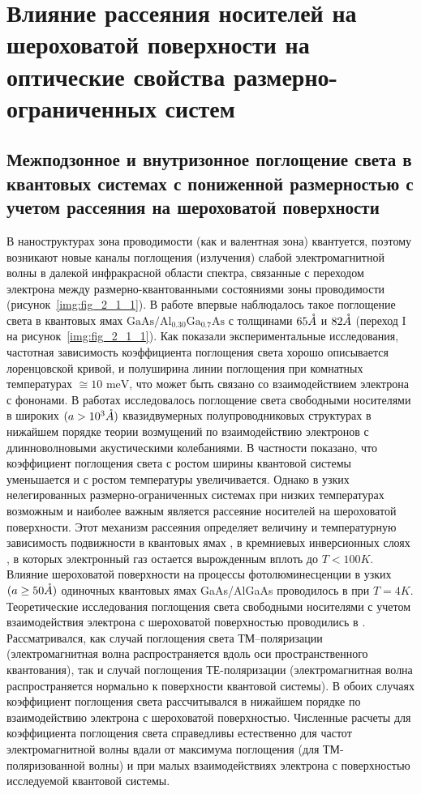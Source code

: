\chapter{Влияние рассеяния носителей на шероховатой поверхности на оптические свойства размерно-ограниченных систем} \label{chapt2}

\section{Межподзонное и внутризонное поглощение света в квантовых системах с пониженной размерностью с учетом рассеяния на шероховатой поверхности} \label{sect2_1}

В наноструктурах зона проводимости (как и валентная зона) квантуется, поэтому возникают новые каналы поглощения (излучения) слабой электромагнитной волны в далекой инфракрасной области спектра, связанные с переходом электрона между размерно-квантованными состояниями зоны проводимости (рисунок~\ref{img:fig_2_1_1}).  В работе \cite{West1985} впервые наблюдалось такое поглощение света в квантовых ямах $\text{GaAs}/\text{Al}_{0.30}\text{Ga}_{0.7}\text{As}$ с толщинами $65 \AA$ и $82 \AA$ (переход I на рисунок~\ref{img:fig_2_1_1}). Как показали экспериментальные исследования, частотная зависимость коэффициента поглощения света хорошо описывается лоренцовской кривой, и полуширина линии поглощения при комнатных температурах $\cong 10 \text{ meV}$, что может быть связано со взаимодействием электрона с фононами. В работах \cite{Wu1994,Spector1983} исследовалось поглощение света свободными носителями в широких $(a > 10^3 \AA)$ квазидвумерных полупроводниковых структурах в нижайшем порядке теории возмущений по взаимодействию электронов с длинноволновыми акустическими колебаниями. В частности показано, что коэффициент поглощения света с ростом ширины квантовой системы уменьшается и с ростом температуры увеличивается. Однако в узких нелегированных размерно-ограниченных системах при низких температурах возможным и наиболее важным является рассеяние носителей на шероховатой поверхности. Этот механизм рассеяния определяет величину и температурную зависимость подвижности в квантовых ямах \cite{Sakaki1987}, в кремниевых инверсионных слоях \cite{Stern1980}, в которых электронный газ остается вырожденным вплоть до $T < 100 K$. Влияние шероховатой поверхности на процессы фотолюминесценции в узких $(a \geq 50 \AA)$ одиночных квантовых ямах GaAs/AlGaAs  проводилось в \cite{Gurioli1991} при $T = 4 K$. Теоретические исследования поглощения света свободными носителями с учетом взаимодействия электрона с шероховатой поверхностью проводились в \cite{Vurgaftman1999}. Рассматривался, как случай поглощения света ТМ–поляризации (электромагнитная волна распространяется вдоль оси пространственного квантования), так и случай поглощения ТЕ-поляризации (электромагнитная волна распространяется нормально к поверхности квантовой системы). В обоих случаях коэффициент поглощения света рассчитывался в нижайшем порядке по взаимодействию электрона с шероховатой поверхностью. Численные расчеты для коэффициента поглощения света справедливы естественно для частот электромагнитной волны вдали от максимума поглощения (для ТМ-поляризованной волны) и при малых взаимодействиях электрона с поверхностью исследуемой квантовой системы.

